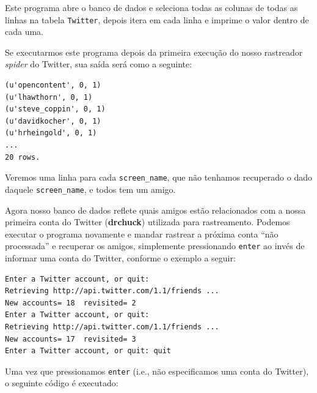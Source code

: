 %
Este programa abre o banco de dados e seleciona todas as colunas de todas as
linhas na tabela {\tt Twitter}, depois itera em cada linha e imprime o valor
dentro de cada uma.


Se executarmos este programa depois da primeira execução do nosso rastreador
{\it spider} do Twitter, sua saída será como a seguinte:

\beforeverb
\begin{verbatim}
(u'opencontent', 0, 1)
(u'lhawthorn', 0, 1)
(u'steve_coppin', 0, 1)
(u'davidkocher', 0, 1)
(u'hrheingold', 0, 1)
...
20 rows.
\end{verbatim}
\afterverb
%

%
Veremos uma linha para cada \verb"screen_name", que não tenhamos recuperado
o dado daquele \verb"screen_name", e todos tem um amigo.


Agora nosso banco de dados reflete quais amigos estão relacionados com a nossa
primeira conta do Twitter ({\bf drchuck}) utilizada para rastreamento. Podemos
executar o programa novamente e mandar rastrear a próxima conta
``não processada'' e recuperar os amigos, simplemente pressionando {\tt enter}
ao invés de informar uma conta do Twitter, conforme o exemplo a seguir:


\beforeverb
\begin{verbatim}
Enter a Twitter account, or quit: 
Retrieving http://api.twitter.com/1.1/friends ...
New accounts= 18  revisited= 2
Enter a Twitter account, or quit: 
Retrieving http://api.twitter.com/1.1/friends ...
New accounts= 17  revisited= 3
Enter a Twitter account, or quit: quit
\end{verbatim}
\afterverb
%

%
Uma vez que pressionamos {\tt enter} (i.e., não especificamos uma conta do
Twitter), o seguinte código é executado:

